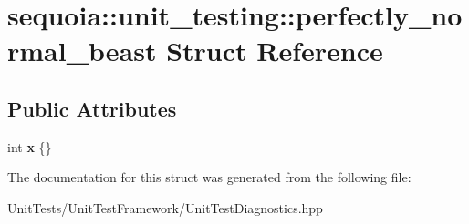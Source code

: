 \hypertarget{structsequoia_1_1unit__testing_1_1perfectly__normal__beast}{}\section{sequoia\+::unit\+\_\+testing\+::perfectly\+\_\+normal\+\_\+beast Struct Reference}
\label{structsequoia_1_1unit__testing_1_1perfectly__normal__beast}
\subsection*{Public Attributes}
\begin{DoxyCompactItemize}
\item 
\mbox{\label{structsequoia_1_1unit__testing_1_1perfectly__normal__beast_a1c2c0f36fe2639cb50dad4b356b81c24}} 
int {\bfseries x} \{\}
\end{DoxyCompactItemize}


The documentation for this struct was generated from the following file\+:\begin{DoxyCompactItemize}
\item 
Unit\+Tests/\+Unit\+Test\+Framework/Unit\+Test\+Diagnostics.\+hpp\end{DoxyCompactItemize}
